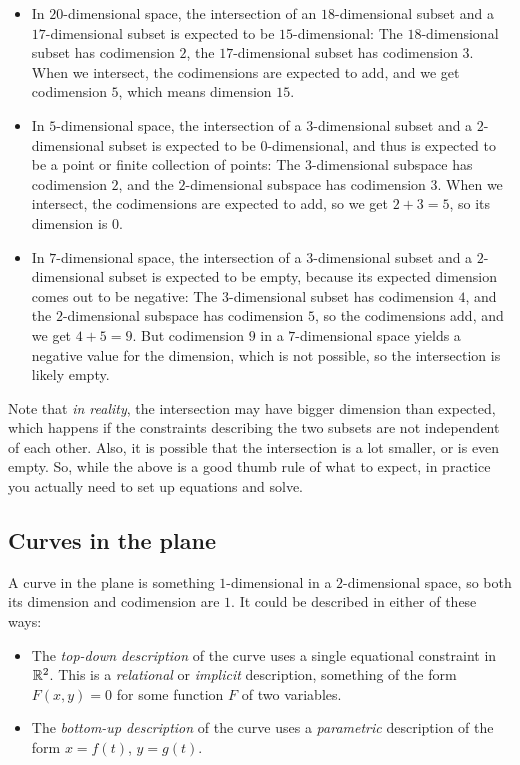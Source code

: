 \documentclass[10pt]{amsart}
\begin{document}
\begin{itemize}
\item In $20$-dimensional space, the intersection of an
  $18$-dimensional subset and a $17$-dimensional subset is expected to
  be $15$-dimensional: The $18$-dimensional subset has codimension
  $2$, the $17$-dimensional subset has codimension $3$. When we
  intersect, the codimensions are expected to add, and we get
  codimension $5$, which means dimension $15$.
\item In $5$-dimensional space, the intersection of a $3$-dimensional
  subset and a $2$-dimensional subset is expected to be
  $0$-dimensional, and thus is expected to be a point or finite
  collection of points: The $3$-dimensional subspace has codimension
  $2$, and the $2$-dimensional subspace has codimension $3$. When we
  intersect, the codimensions are expected to add, so we get $2 + 3 =
  5$, so its dimension is $0$.
\item In $7$-dimensional space, the intersection of a $3$-dimensional
  subset and a $2$-dimensional subset is expected to be empty, because
  its expected dimension comes out to be negative: The $3$-dimensional
  subset has codimension $4$, and the $2$-dimensional subspace has
  codimension $5$, so the codimensions add, and we get $4 + 5 =
  9$. But codimension $9$ in a $7$-dimensional space yields a negative
  value for the dimension, which is not possible, so the intersection
  is likely empty.
\end{itemize}

Note that {\em in reality}, the intersection may have bigger dimension
than expected, which happens if the constraints describing the two
subsets are not independent of each other. Also, it is possible that
the intersection is a lot smaller, or is even empty. So, while the
above is a good thumb rule of what to expect, in practice you actually
need to set up equations and solve.

\subsection{Curves in the plane}

A curve in the plane is something $1$-dimensional in a $2$-dimensional
space, so both its dimension and codimension are $1$. It could be
described in either of these ways:

\begin{itemize}
\item The {\em top-down description} of the curve uses a single
  equational constraint in $\mathbb{R}^2$. This is a {\em relational} or {\em
  implicit} description, something of the form $F(x,y) = 0$ for some
  function $F$ of two variables.
\item The {\em bottom-up description} of the curve uses a {\em
  parametric} description of the form $x = f(t)$, $y = g(t)$.
\end{itemize}
\end{document}
